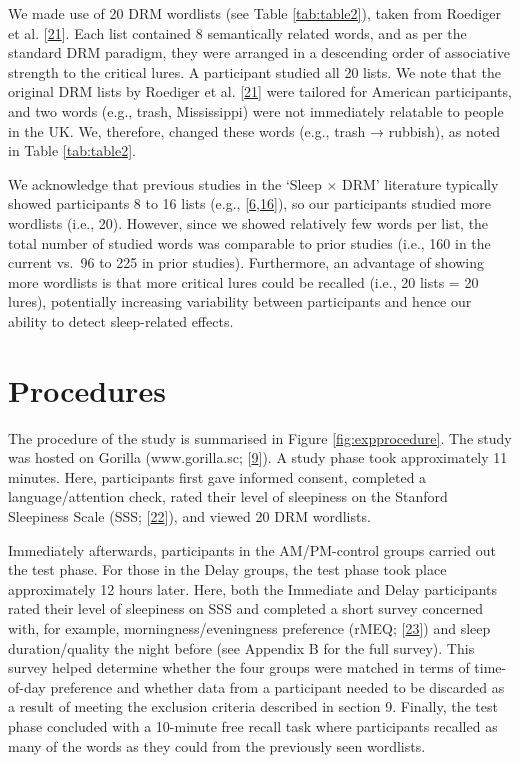 \documentclass[
]{article}
\begin{document}
We made use of 20 DRM wordlists (see Table \ref{tab:table2}), taken from Roediger et al. {[}\protect\hyperlink{ref-roediger2001a}{21}{]}. Each list contained 8 semantically related words, and as per the standard DRM paradigm, they were arranged in a descending order of associative strength to the critical lures. A participant studied all 20 lists. We note that the original DRM lists by Roediger et al. {[}\protect\hyperlink{ref-roediger2001a}{21}{]} were tailored for American participants, and two words (e.g., trash, Mississippi) were not immediately relatable to people in the UK. We, therefore, changed these words (e.g., trash → rubbish), as noted in Table \ref{tab:table2}.

We acknowledge that previous studies in the `Sleep \(\times\) DRM' literature typically showed participants 8 to 16 lists (e.g., {[}\protect\hyperlink{ref-payne2009a}{6},\protect\hyperlink{ref-mckeon2012a}{16}{]}), so our participants studied more wordlists (i.e., 20). However, since we showed relatively few words per list, the total number of studied words was comparable to prior studies (i.e., 160 in the current vs.~96 to 225 in prior studies). Furthermore, an advantage of showing more wordlists is that more critical lures could be recalled (i.e., 20 lists = 20 lures), potentially increasing variability between participants and hence our ability to detect sleep-related effects.

\hypertarget{procedures}{%
\section{Procedures}\label{procedures}}

The procedure of the study is summarised in Figure \ref{fig:expprocedure}. The study was hosted on Gorilla (www.gorilla.sc; {[}\protect\hyperlink{ref-anwyl-irvine2020a}{9}{]}). A study phase took approximately 11 minutes. Here, participants first gave informed consent, completed a language/attention check, rated their level of sleepiness on the Stanford Sleepiness Scale (SSS; {[}\protect\hyperlink{ref-hoddes1973a}{22}{]}), and viewed 20 DRM wordlists.

Immediately afterwards, participants in the AM/PM-control groups carried out the test phase. For those in the Delay groups, the test phase took place approximately 12 hours later. Here, both the Immediate and Delay participants rated their level of sleepiness on SSS and completed a short survey concerned with, for example, morningness/eveningness preference (rMEQ; {[}\protect\hyperlink{ref-adan1991a}{23}{]}) and sleep duration/quality the night before (see Appendix B for the full survey). This survey helped determine whether the four groups were matched in terms of time-of-day preference and whether data from a participant needed to be discarded as a result of meeting the exclusion criteria described in section 9. Finally, the test phase concluded with a 10-minute free recall task where participants recalled as many of the words as they could from the previously seen wordlists.
\end{document}
